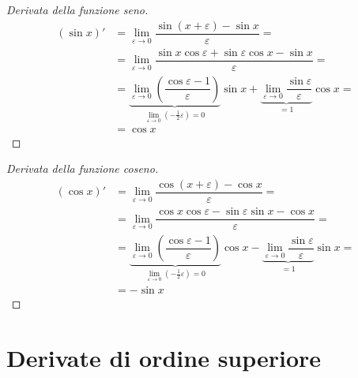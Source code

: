 \begin{proof}[Derivata della funzione seno]
\begin{equation}
    \begin{aligned}
        (\sin x)' 
        & = \lim_{\varepsilon \rightarrow 0 } \dfrac{\sin(x+\varepsilon) - \sin x}{\varepsilon} = \\
        & = \lim_{\varepsilon \rightarrow 0 } \dfrac{\sin x \cos\varepsilon + \sin \varepsilon \cos x - \sin x}{\varepsilon} = \\
        & = \underbrace{\lim_{\varepsilon \rightarrow 0 } \left( \dfrac{ \cos\varepsilon - 1}{\varepsilon} \right) }_{\lim_{\varepsilon \rightarrow 0} \left(-\frac{1}{2} \varepsilon \right) = 0 } \sin x +  \underbrace{\lim_{\varepsilon \rightarrow 0 } \dfrac{\sin \varepsilon}{\varepsilon} }_{= 1} \cos x  = \\
        & = \cos x 
    \end{aligned}
\end{equation}
\end{proof}
\begin{proof}[Derivata della funzione coseno]
\begin{equation}
    \begin{aligned}
        (\cos x)' 
        & = \lim_{\varepsilon \rightarrow 0 } \dfrac{\cos(x+\varepsilon) - \cos x}{\varepsilon} = \\
        & = \lim_{\varepsilon \rightarrow 0 } \dfrac{\cos x \cos\varepsilon - \sin \varepsilon \sin x - \cos x}{\varepsilon} = \\
        & = \underbrace{\lim_{\varepsilon \rightarrow 0 } \left( \dfrac{ \cos\varepsilon - 1}{\varepsilon} \right) }_{\lim_{\varepsilon \rightarrow 0} \left(-\frac{1}{2} \varepsilon \right) = 0 } \cos x -  \underbrace{\lim_{\varepsilon \rightarrow 0 } \dfrac{\sin \varepsilon}{\varepsilon} }_{= 1} \sin x  = \\
        & = - \sin x 
    \end{aligned}
\end{equation}
\end{proof}

\section{Derivate di ordine superiore}

